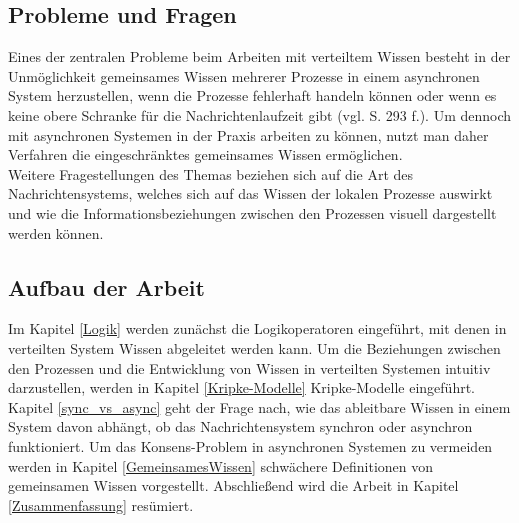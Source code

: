 \subsection{Probleme und Fragen}
Eines der zentralen Probleme beim Arbeiten mit verteiltem Wissen besteht in der Unmöglichkeit gemeinsames Wissen mehrerer Prozesse in einem asynchronen System herzustellen, wenn die Prozesse fehlerhaft handeln können oder wenn es keine obere Schranke für die Nachrichtenlaufzeit gibt (vgl.\cite{kshemkalyani2011distributed} S. 293 f.).
Um dennoch mit asynchronen Systemen in der Praxis arbeiten zu können, nutzt man daher Verfahren die eingeschränktes gemeinsames Wissen ermöglichen.\\
Weitere Fragestellungen des Themas beziehen sich auf die Art des Nachrichtensystems, welches sich auf das Wissen der lokalen Prozesse auswirkt und wie die Informationsbeziehungen zwischen den Prozessen visuell dargestellt werden können.

\subsection{Aufbau der Arbeit}
Im Kapitel \ref{Logik} werden zunächst die Logikoperatoren eingeführt, mit denen in verteilten System Wissen abgeleitet werden kann.
Um die Beziehungen zwischen den Prozessen und die Entwicklung von Wissen in verteilten Systemen intuitiv darzustellen, werden in Kapitel \ref{Kripke-Modelle} Kripke-Modelle eingeführt. Kapitel \ref{sync_vs_async} geht der Frage nach, wie das ableitbare Wissen in einem System davon abhängt, ob das Nachrichtensystem synchron oder asynchron funktioniert. Um das Konsens-Problem in asynchronen Systemen zu vermeiden werden in Kapitel \ref{GemeinsamesWissen} schwächere Definitionen von gemeinsamen Wissen vorgestellt.
Abschließend wird die Arbeit in Kapitel \ref{Zusammenfassung} resümiert.